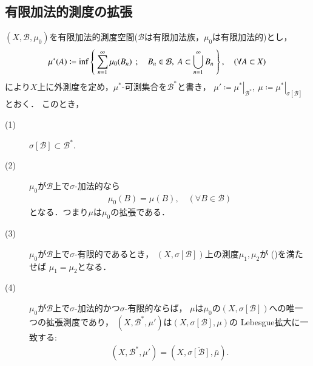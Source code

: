	\subsection{有限加法的測度の拡張}
		\begin{screen}
			\begin{thm}
				$(X,\mathcal{B},\mu_0)$を有限加法的測度空間($\mathcal{B}$は有限加法族，$\mu_0$は有限加法的)とし，
				\begin{align}
					\mu^*(A) \coloneqq \operatorname*{inf}_{} \left\{\ \sum_{n=1}^\infty \mu_0(B_n)\ \, ; \quad B_n \in \mathcal{B},\ A \subset \bigcup_{n=1}^\infty B_n\ \right\},
					\quad (\forall A \subset X)
				\end{align}
				により$X$上に外測度を定め，$\mu^*$-可測集合を$\mathcal{B}^*$と書き，
				$\mu' \coloneqq\left.\mu^*\right|_{\mathcal{B}^*},
				\ \mu \coloneqq \left.\mu^*\right|_{\sigma[\mathcal{B}]}$とおく．
				このとき，
				\begin{description}
					\item[(1)] $\sigma[\mathcal{B}] \subset \mathcal{B}^*.$
					\item[(2)] $\mu_0$が$\mathcal{B}$上で$\sigma$-加法的なら
						\begin{align}
							\mu_0(B) = \mu(B),\quad (\forall B \in \mathcal{B})
							\label{eq:appendix_finite_additive_measure_expansion_1}
						\end{align}
						となる．つまり$\mu$は$\mu_0$の拡張である．
						
					\item[(3)] $\mu_0$が$\mathcal{B}$上で$\sigma$-有限的であるとき，
						$\left( X,\sigma[\mathcal{B}] \right)$上の測度$\mu_1,\mu_2$が
						()を満たせば
						$\mu_1 = \mu_2$となる．
					
					\item[(4)] $\mu_0$が$\mathcal{B}$上で$\sigma$-加法的かつ$\sigma$-有限的ならば，
						$\mu$は$\mu_0$の$\left( X,\sigma[\mathcal{B}] \right)$への唯一つの拡張測度であり，
						$\left( X,\mathcal{B}^*,\mu' \right)$は$(X,\sigma[\mathcal{B}],\mu)$の
						Lebesgue拡大に一致する:
						\begin{align}
							\left( X,\mathcal{B}^*,\mu' \right) 
							= \left( X,\overline{\sigma[\mathcal{B}]},\overline{\mu} \right).
						\end{align}
				\end{description}
			\end{thm}
		\end{screen}